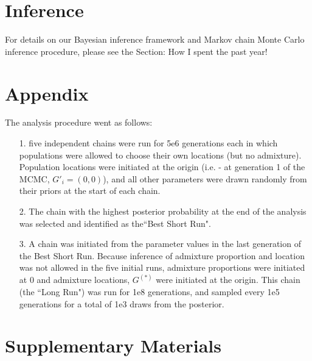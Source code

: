 \documentclass[12pt]{article}
\newcommand{\admixsource}[1]{{$G^{(*)}$}}
\begin{document}
\section*{Inference}
For details on our Bayesian inference framework and Markov chain Monte Carlo inference procedure, please see the Section: How I spent the past year!



\section*{Appendix}

The analysis procedure went as follows: 
\begin{itemize}
\item[1.] five independent chains were run for 5e6 generations each in which populations were allowed to choose their own locations (but no admixture).  Population locations were initiated at the origin (i.e. - at generation 1 of the MCMC, $G'_i = (0,0)$), and all other parameters were drawn randomly from their priors at the start of each chain.  
%
\item[2.]The chain with the highest posterior probability at the end of the analysis was selected and identified as the``Best Short Run".
%
\item[3.] A chain was initiated from the parameter values in the last generation of the Best Short Run.  Because inference of admixture proportion and location was not allowed in the five initial runs, admixture proportions were initiated at 0 and admixture locations, \admixsource{G} were initiated at the origin.  This  chain (the ``Long Run") was run for 1e8 generations, and sampled every 1e5 generations for a total of 1e3 draws from the posterior.
\end{itemize}

\newpage


\section*{Supplementary Materials}
\end{document}

